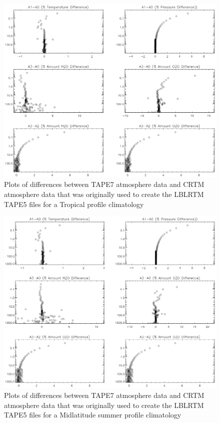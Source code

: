 \begin{figure}[htp]
  \centering{}
  \includegraphics[scale=0.8]{./graphics/Atmosphere_Differences_08.eps}
  \caption{Plots of differences between TAPE7 atmosphere data and CRTM atmosphere data
  that was originally used to create the LBLRTM TAPE5 files for a Tropical profile climatology}
  \label{fig:Differences_Tropical}
\end{figure}

\begin{figure}[htp]
  \centering{}
  \includegraphics[scale=0.8]{./graphics/Atmosphere_Differences_01.eps}
  \caption{Plots of differences between TAPE7 atmosphere data and CRTM atmosphere data
  that was originally used to create the LBLRTM TAPE5 files for a Midlatitude summer profile climatology}
  \label{fig:Differences_Midlatitude_summer}
\end{figure}

